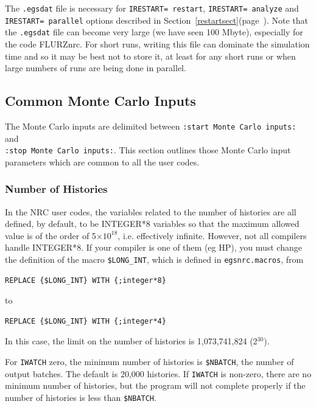 \documentclass[12pt,twoside]{article}  %
\newcommand{\lpage}[1]{(page~\pageref{#1})}
\begin{document}
The {\tt .egsdat} file is necessary for {\tt IRESTART= restart},
{\tt IRESTART= analyze} and {\tt IRESTART= parallel} options described in
Section~\ref{restartsect}\lpage{restartsect}.  Note that the {\tt .egsdat}
file can become very large (we have seen 100 Mbyte), especially for
the code FLURZnrc.  For short runs, writing this file can dominate the
simulation time and so it may be best not to store it, at least for any
short runs or when large numbers of runs are being done in parallel.

\subsection{Common Monte Carlo Inputs}
\label{MC_inputs}

The Monte Carlo inputs are delimited between
\verb+:start Monte Carlo inputs:+ and \\
\verb+:stop Monte Carlo inputs:+. This section outlines those
Monte Carlo input parameters which are common to all the user codes.

\subsubsection{Number of Histories}
\label{histsect}

In the NRC user codes, the variables related to the number of histories
are all defined, by default, to be INTEGER*8 variables so that the
maximum allowed value is of the order of 5$\times 10^{18}$, i.e.
effectively infinite.  However, not all compilers handle INTEGER*8. If
your compiler is one of them (eg HP), you must change the definition of
the macro {\tt \$LONG\_INT}, which is defined in {\tt egsnrc.macros}, from
\begin{verbatim}
REPLACE {$LONG_INT} WITH {;integer*8}
\end{verbatim}
to
\begin{verbatim}
REPLACE {$LONG_INT} WITH {;integer*4}
\end{verbatim}
In this case, the limit on the number of histories is 1,073,741,824
(2$^{30}$).

For {\tt IWATCH} zero, the minimum number of histories is {\tt \$NBATCH},
the number of output batches. 
The default is 20,000 histories.
If {\tt IWATCH} is non-zero, there are no minimum number of histories,
but the program will not complete properly if the number of histories
is less than {\tt \$NBATCH}.
\end{document}
